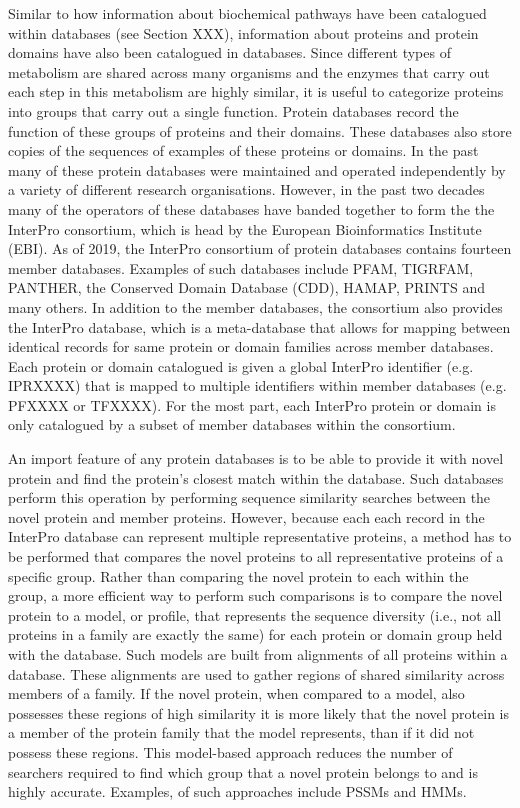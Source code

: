 Similar to how information about biochemical pathways have been catalogued within databases (see Section XXX), information about proteins and protein domains have also been catalogued in databases. Since different types of metabolism are shared across many organisms and the enzymes that carry out each step in this metabolism are highly similar, it is useful to categorize proteins into groups that carry out a single function. Protein databases record the function of these groups of proteins and their domains. These databases also store copies of the sequences of examples of these proteins or domains. In the past many of these protein databases were maintained and operated independently by a variety of different research organisations. However, in the past two decades many of the operators of these databases have banded together to form the the InterPro consortium, which is head by the European Bioinformatics Institute (EBI). As of 2019, the InterPro consortium of protein databases contains fourteen member databases. Examples of such databases include PFAM, TIGRFAM, PANTHER, the Conserved Domain Database (CDD), HAMAP, PRINTS  and many others. In addition to the member databases, the consortium also provides the InterPro database, which is a meta-database that allows for mapping between identical records for same protein or domain families across member databases. Each protein or domain catalogued is given a global InterPro identifier (e.g. IPRXXXX) that is mapped to multiple identifiers within member databases (e.g. PFXXXX or TFXXXX). For the most part, each InterPro protein or domain is only catalogued by a subset of member databases within the consortium.

An import feature of any protein databases is to be able to provide it with novel protein and find the protein's closest match within the database. Such databases perform this operation by performing sequence similarity searches between the novel protein and member proteins. However, because each each record in the InterPro database can represent multiple representative proteins, a method has to be performed that compares the novel proteins to all representative proteins of a specific group. Rather than comparing the novel protein to each within the group, a more efficient way to perform such comparisons is to compare the novel protein to a model, or profile, that represents the sequence diversity (i.e., not all proteins in a family are exactly the same) for each protein or domain group held with the database. Such models are built from alignments of all proteins within a database. These alignments are used to gather regions of shared similarity across members of a family. If the novel protein, when compared to a model, also possesses these regions of high similarity it is more likely that the novel protein is a member of the protein family that the model represents, than if it did not possess these regions. This model-based approach reduces the number of searchers required to find which group that a novel protein belongs to and is highly accurate. Examples, of such approaches include PSSMs and HMMs.


